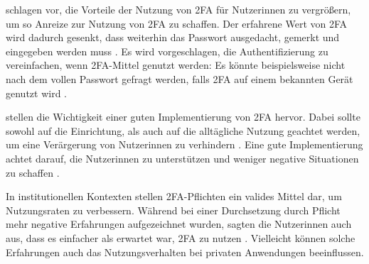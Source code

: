 \pskip
\textcite{dasWhyJohnny2018} schlagen vor, die Vorteile der Nutzung von \ac{2FA} für Nutzerinnen zu vergrößern, um so Anreize zur Nutzung von \ac{2FA} zu schaffen. Der erfahrene Wert von \ac{2FA} wird dadurch gesenkt, dass weiterhin das Passwort ausgedacht, gemerkt und eingegeben werden muss \parencite{dasWhyJohnny2018}. Es wird vorgeschlagen, die Authentifizierung zu vereinfachen, wenn \ac{2FA}-Mittel genutzt werden: Es könnte beispielsweise nicht nach dem vollen Passwort gefragt werden, falls \ac{2FA} auf einem bekannten Gerät genutzt wird \parencite{dasWhyJohnny2018}.

\pskip
\textcite{colnagoItsNot2018} stellen die Wichtigkeit einer guten Implementierung von \ac{2FA} hervor. Dabei sollte sowohl auf die Einrichtung, als auch auf die alltägliche Nutzung geachtet werden, um eine Verärgerung von Nutzerinnen zu verhindern \parencite{colnagoItsNot2018}. Eine gute Implementierung achtet darauf, die Nutzerinnen zu unterstützen und weniger negative Situationen zu schaffen \parencite{colnagoItsNot2018}.

In institutionellen Kontexten stellen \ac{2FA}-Pflichten ein valides Mittel dar, um Nutzungsraten zu verbessern. Während bei einer Durchsetzung durch Pflicht mehr negative Erfahrungen aufgezeichnet wurden, sagten die Nutzerinnen auch aus, dass es einfacher als erwartet war, \ac{2FA} zu nutzen \parencite{colnagoItsNot2018}. Vielleicht können solche Erfahrungen auch das Nutzungsverhalten bei privaten Anwendungen beeinflussen.
